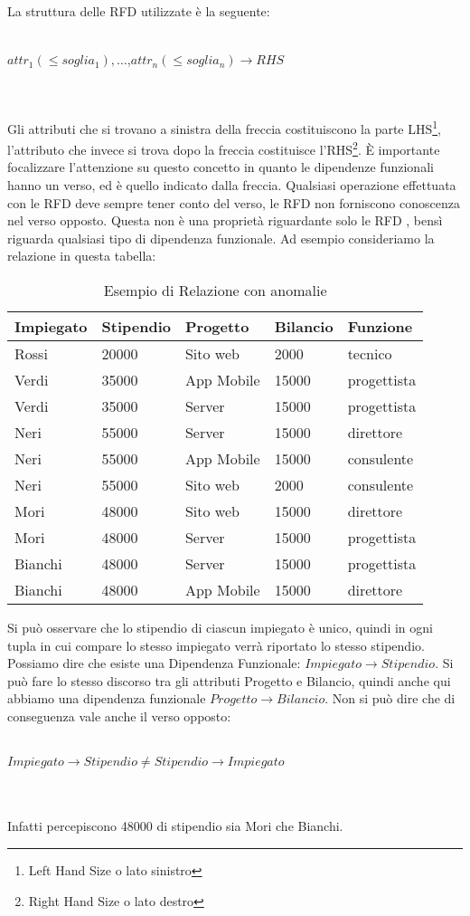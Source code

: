 La struttura delle RFD utilizzate è la seguente:
\\~\\
\centerline{$attr_1(\leq soglia_1),\ldots$,$attr_n(\leq soglia_n) \xrightarrow{} RHS$}
\\~\\
Gli attributi che si trovano a sinistra della freccia costituiscono la parte LHS\footnote{Left Hand Size o lato sinistro}, l'attributo che invece si trova dopo la freccia costituisce l'RHS\footnote{Right Hand Size o lato destro}. 
È importante focalizzare l'attenzione su questo concetto in quanto le dipendenze funzionali hanno un verso, ed è quello indicato dalla freccia. Qualsiasi operazione effettuata con le RFD deve sempre tener conto del verso, le RFD non forniscono conoscenza nel verso opposto. Questa non è una proprietà riguardante solo le RFD , bensì riguarda qualsiasi tipo di dipendenza funzionale.
Ad esempio consideriamo la relazione in questa tabella:
\begin{table}[H]
    \centering
    \begin{tabular}{|l |l |l |l |l |}
    \hline
     Impiegato & Stipendio & Progetto & Bilancio & Funzione \\
    \hline
    Rossi & 20000  & Sito web & 2000 & tecnico\\
    Verdi & 35000 & App Mobile & 15000 & progettista\\
    Verdi & 35000 & Server & 15000 & progettista\\
    Neri & 55000 & Server & 15000 & direttore\\
    Neri & 55000 & App Mobile & 15000 & consulente\\
    Neri & 55000 & Sito web & 2000 & consulente\\
    Mori & 48000 & Sito web & 15000 & direttore\\
    Mori & 48000 & Server & 15000 & progettista\\
    Bianchi & 48000 & Server & 15000 & progettista\\
    Bianchi & 48000 & App Mobile & 15000 & direttore\\
    \hline
    \end{tabular}
    \caption{Esempio di Relazione con anomalie}
    \label{tab:relationship_anomalies}
\end{table}
Si può osservare che lo stipendio di ciascun impiegato è unico, quindi in ogni tupla in cui compare lo stesso impiegato verrà riportato lo stesso stipendio. Possiamo dire che esiste una Dipendenza Funzionale: 
$Impiegato \xrightarrow{} Stipendio$. 
Si può fare lo stesso discorso tra gli attributi Progetto e Bilancio, quindi anche qui abbiamo una dipendenza funzionale
$Progetto\xrightarrow{}Bilancio$. 
Non si può dire che di conseguenza vale anche il verso opposto:
\\~\\
\centerline{$Impiegato \xrightarrow{} Stipendio \neq Stipendio \xrightarrow{} Impiegato$} 
\\~\\
Infatti percepiscono 48000 di stipendio sia Mori che Bianchi.\cite{libroCeri}
